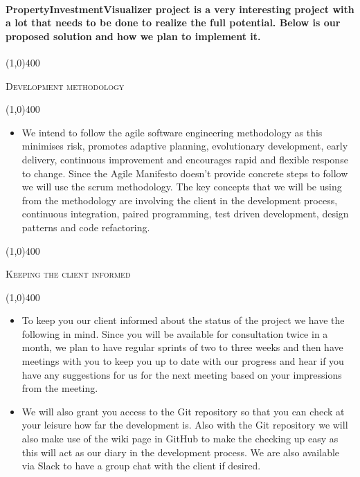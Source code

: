 \documentclass[12pt,a4paper]{report}
\begin{document}
	{\paragraph*{PropertyInvestmentVisualizer project is a very interesting project with a lot that needs to be done to realize the
full potential. Below is our proposed solution and how we plan to implement it.} 
	\begin{center}
	
	\line(1,0){400}\\
	{\scshape\large Development methodology \par}
	\line(1,0){400}\\
	\end{center}
		\begin{itemize}
\item We intend to follow the agile software engineering methodology as this minimises risk, promotes adaptive
planning, evolutionary development, early delivery, continuous improvement and encourages rapid and flexible
response to change. Since the Agile Manifesto doesn’t provide concrete steps to follow we will use the scrum
methodology. The key concepts that we will be using from the methodology are involving the client in the
development process, continuous integration, paired programming, test driven development, design patterns and
code refactoring.
 
\end{itemize}

\begin{center}
	
	\line(1,0){400}\\
	{\scshape\large Keeping the client informed \par}
	\line(1,0){400}\\
	\end{center}
		\begin{itemize}
\item To keep you our client informed about the status of the project we have the following in mind. Since
you will be available for consultation twice in a month, we plan to have regular sprints of two to three
weeks and then have meetings with you to keep you up to date with our progress and hear if you have
any suggestions for us for the next meeting based on your impressions from the meeting.
\item  We will also
grant you access to the Git repository so that you can check at your leisure how far the development
is. Also with the Git repository we will also make use of the wiki page in GitHub to make the
checking up easy as this will act as our diary in the development process. We are also available via
Slack to have a group chat with the client if desired. 


\end{itemize}}
\end{document}
